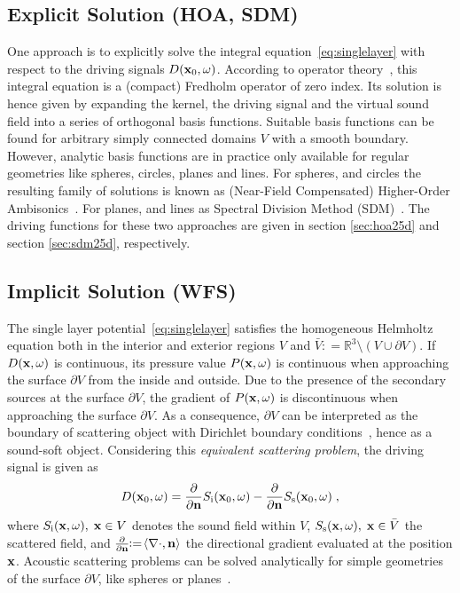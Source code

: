\documentclass{article}
\newcommand{\defeq}{\mathrel{\!\mathop:}=}
\begin{document}
\subsection{Explicit Solution (HOA, SDM)}%
\label{sec:explicitsolution}
%
One approach is to explicitly solve the integral equation~\eqref{eq:singlelayer} with
respect to the driving signals $D(  \mathbf{x}  _0,\omega)$. According to operator
theory~\cite{Giroire1982,Fazi2008,Spors2008b},
this integral equation is a (compact) Fredholm operator of zero index. Its solution is hence given
by expanding the kernel, the driving signal and the virtual sound field into a series
of orthogonal basis functions. Suitable basis functions can be found for arbitrary simply
connected domains $V$ with a smooth boundary. However, analytic basis functions are in practice
only available for regular geometries like spheres, circles, planes and lines. For spheres,
and circles the resulting family of solutions is known as (Near-Field Compensated) Higher-Order
Ambisonics~\cite{Daniel2001,Poletti2005,Fazi2008,Ahrens2008a}. For planes, and lines as
Spectral Division Method (SDM)~\cite{Ahrens2010a,Ahrens2008}.
The driving functions for these two approaches are given in section
\ref{sec:hoa25d} and section \ref{sec:sdm25d}, respectively.

\subsection{Implicit Solution (WFS)}
\label{sec:implicitsolution}
%
The single layer potential~\eqref{eq:singlelayer} satisfies the homogeneous
Helmholtz equation both in the interior and exterior regions $V$ and
$\bar{V} \defeq \mathbb{R}^3 \setminus (V \cup \partial V)$.
If $D(  \mathbf{x}  ,\omega)$ is continuous, its pressure value $P(  \mathbf{x}  ,\omega)$ is continuous when approaching
the surface $\partial V$ from the inside and outside.
Due to the presence of the secondary sources at the
surface $\partial V$, the gradient of $P(  \mathbf{x}  ,\omega)$ is discontinuous when approaching the surface
$\partial V$. As a consequence, $\partial V$ can be
interpreted as the boundary of scattering object with Dirichlet boundary
conditions~\cite{Fazi2009}, hence as a sound-soft object.
Considering this {\em equivalent scattering problem}, the driving signal is given
as~\cite{Williams1999,Fazi2009}
\begin{equation}
    D(  \mathbf{x}  _0,\omega) = \frac{\partial}{\partial   \mathbf{n}  } S_\text{i}(  \mathbf{x}  _0,\omega) -
    \frac{\partial}{\partial   \mathbf{n}  } S_\text{s}(  \mathbf{x}  _0,\omega)\;,
\end{equation}
where $S_\text{i}(  \mathbf{x}  ,\omega), \;   \mathbf{x}  \in V$ denotes the sound field within $V$,
$S_\text{s}(  \mathbf{x}  ,\omega), \;   \mathbf{x}  \in \bar{V}$ the scattered field, and
$\frac{\partial}{\partial \n}\!\defeq\!\langle\nabla \cdot,\n\rangle$ the
directional gradient evaluated at the position $  \mathbf{x}  $. Acoustic scattering problems can
be solved analytically for simple geometries of the surface $\partial V$, like spheres
or planes~\cite{Bowman87:Book}.
\end{document}
